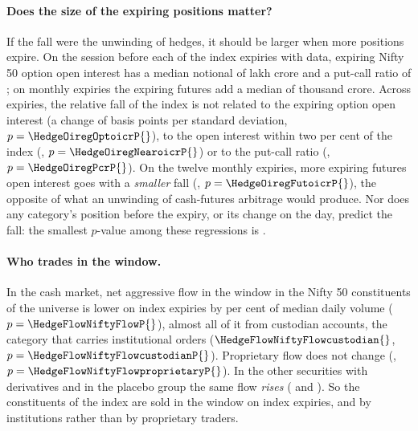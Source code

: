 \paragraph{Does the size of the expiring positions matter?} If the fall were the unwinding of
hedges, it should be larger when more positions expire. On the session before each of the
\HedgeExpiries{} index expiries with data, expiring Nifty 50 option open interest has a median
notional of \HedgeOptoi{} lakh crore and a put-call ratio of \HedgePcr{}; on monthly expiries
the expiring futures add a median of \HedgeFutoi{} thousand crore. Across expiries, the relative
fall of the index is not related to the expiring option open interest (a change of
\HedgeOiregOptoicr{} basis points per standard deviation, $p = \HedgeOiregOptoicrP{}$), to the
open interest within two per cent of the index (\HedgeOiregNearoicr{}, $p = \HedgeOiregNearoicrP{}$)
or to the put-call ratio (\HedgeOiregPcr{}, $p = \HedgeOiregPcrP{}$). On the twelve monthly
expiries, more expiring futures open interest goes with a \emph{smaller} fall
(\HedgeOiregFutoicr{}, $p = \HedgeOiregFutoicrP{}$), the opposite of what an unwinding of
cash-futures arbitrage would produce. Nor does any category's position before the expiry, or its
change on the day, predict the fall: the smallest $p$-value among these regressions is
\HedgePosregMinp{}.

\paragraph{Who trades in the window.} In the cash market, net aggressive flow in the window in
the \HedgeFlowNiftyStocks{} Nifty 50 constituents of the universe is lower on index expiries by
\HedgeFlowNiftyFlow{} per cent of median daily volume ($p = \HedgeFlowNiftyFlowP{}$), almost
all of it from custodian accounts, the category that carries institutional orders
($\HedgeFlowNiftyFlowcustodian{}$, $p = \HedgeFlowNiftyFlowcustodianP{}$). Proprietary flow does
not change (\HedgeFlowNiftyFlowproprietary{}, $p = \HedgeFlowNiftyFlowproprietaryP{}$). In the
other securities with derivatives and in the placebo group the same flow \emph{rises}
(\HedgeFlowOtherfoFlow{} and \HedgeFlowPlaceboFlow{}). So the constituents of the index are sold
in the window on index expiries, and by institutions rather than by proprietary traders.

